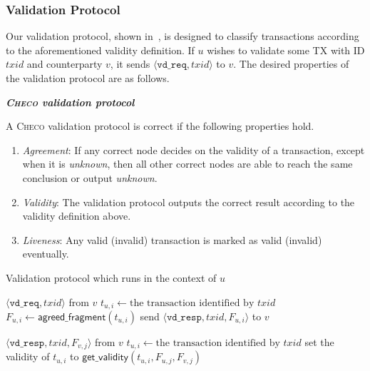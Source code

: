 \subsubsection{Validation Protocol}
Our validation protocol,
shown in~,
is designed to classify transactions according to the aforementioned validity definition.
If $u$ wishes to validate some TX with ID $txid$ and counterparty $v$, it sends $\langle \texttt{vd\_req}, txid \rangle$ to $v$.
The desired properties of the validation protocol are as follows.
\begin{definition}
\label{def:validation}
\textbf{\emph{\textsc{Checo} validation protocol}}

A \textsc{Checo} validation protocol is correct if the following properties hold.
\begin{enumerate}
    \item \emph{Agreement}:
        If any correct node decides on the validity of a transaction, except when it is \emph{unknown},
        then all other correct nodes are able to reach the same conclusion or output \emph{unknown}.
    \item \emph{Validity}:
        The validation protocol outputs the correct result
        according to the validity definition above.
    \item \emph{Liveness}:
        Any valid (invalid) transaction is marked as valid (invalid) eventually.
\end{enumerate}
\end{definition}

\begin{algorithm}
\caption{Validation protocol which runs in the context of $u$}
\label{alg:vd-proto}

\begin{algorithmic}
    \Upon $\langle \texttt{vd\_req}, txid \rangle$ from $v$
        \State $t_{u, i} \gets \text{the transaction identified by } txid$
        \State $F_{u, i} \gets \textsf{agreed\_fragment}(t_{u, i})$
        \State send $\langle \texttt{vd\_resp}, txid, F_{u, i} \rangle$ to $v$

    \Upon $\langle \texttt{vd\_resp}, txid, F_{v, j} \rangle$ from $v$
        \State $t_{u, i} \gets \text{the transaction identified by } txid$
            \State set the validity of $t_{u, i}$ to $\textsf{get\_validity}(t_{u, i}, F_{u, j}, F_{v, j})$
        \EndIf
\end{algorithmic}
\end{algorithm}

